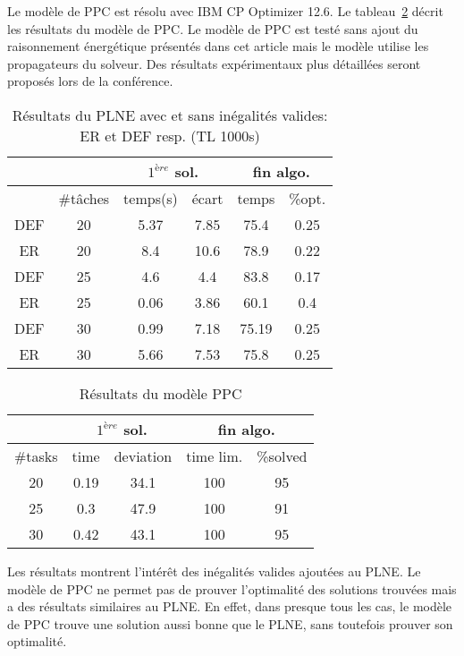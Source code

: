 Le modèle de PPC est résolu avec IBM CP Optimizer 12.6. Le
tableau~\ref{table2} décrit les résultats du modèle de PPC.  Le modèle 
de PPC est testé sans ajout du raisonnement énergétique présentés dans
cet article mais le modèle utilise les propagateurs du solveur. Des
résultats expérimentaux plus détaillées seront proposés lors de la
conférence.
\begin{table}
\centering
    \begin{tabular}{|c|c|cc|cc|}
      \hline
       & & \multicolumn{2}{c|}{$1^{ère}$ sol.} & \multicolumn{2}{c|}{fin algo.}\\
      \hline
    &  \#tâches & temps(s) &  écart & temps  & \%opt. \\
      \hline
      DEF	&	20	&	5.37	&	7.85	&	75.4	&	0.25\\
      ER	&	20	&	8.4	&	10.6	&	78.9	&	0.22\\
      \hline
      DEF	&	25	&	4.6	&	4.4	&	83.8	&	0.17\\
      ER	&	25	&	0.06	&	3.86	&	60.1	&	0.4\\
      \hline
      DEF	&	30	&	0.99	&	7.18	&	75.19	&	0.25\\
      ER	&	30	&	5.66	&	7.53	&	75.8	&	0.25\\
      \hline
    \end{tabular}
  \caption{Résultats du PLNE avec et sans inégalités valides: ER et
    DEF resp. (TL 1000s)}
  \label{table1}
\end{table}


\begin{table}
\centering
    \begin{tabular}{|c|cc|cc|}
      \hline
      & \multicolumn{2}{c|}{$1^{ère}$ sol.} & \multicolumn{2}{c|}{fin algo.}\\
      \hline
      \#tasks & time & deviation & time lim. &  \%solved \\
      \hline
20	&0.19&	34.1&	100&	95\\
25	&0.3	&47.9&	100	&91\\
30	&0.42	&43.1	&100	&95\\
      \hline
    \end{tabular}
  \caption{Résultats du modèle PPC}
\label{table2}
\end{table}

Les résultats montrent l'intérêt des inégalités valides ajoutées au
PLNE. Le modèle de PPC ne permet pas de prouver l'optimalité des solutions
trouvées mais a des résultats similaires au PLNE. En effet, dans
presque tous les cas, le modèle de PPC trouve une solution aussi bonne
que le PLNE, sans toutefois prouver son optimalité.

